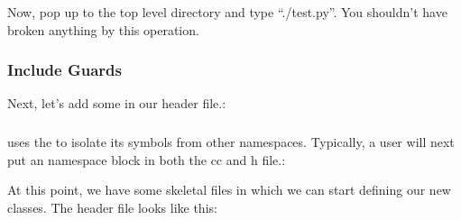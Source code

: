 \documentclass[letterpaper,10pt,english]{sphinxmanual}
\begin{document}
Now, pop up to the top level directory and type “./test.py”.  You
shouldn’t have broken anything by this operation.


\subsubsection{Include Guards}
\label{\detokenize{new-models:include-guards}}
Next, let’s add some  in our header file.:

\begin{sphinxVerbatim}[commandchars=\\\{\}]
\end{sphinxVerbatim}


\subsubsection{}
\label{\detokenize{new-models:namespace-ns3}}
 uses the  
to isolate its symbols from other namespaces. Typically, a user will next put
an  namespace block in both the cc and h file.:

\begin{sphinxVerbatim}[commandchars=\\\{\}]
  
\end{sphinxVerbatim}

At this point, we have some skeletal files in which we can start defining
our new classes. The header file looks like this:

\begin{sphinxVerbatim}[commandchars=\\\{\}]

  

 
\end{sphinxVerbatim}
\end{document}
